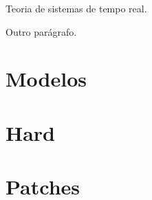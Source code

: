 
Teoria de sistemas de tempo real.

Outro parágrafo.

\section{Modelos}
\section{Hard}
\section{Patches}